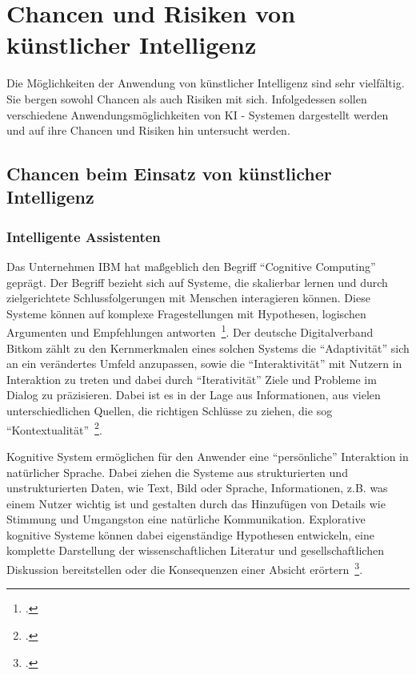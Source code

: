 \section{Chancen und Risiken von künstlicher Intelligenz} \label{Chancen und Risken von KI}
Die Möglichkeiten der Anwendung von künstlicher Intelligenz sind sehr vielfältig. Sie bergen sowohl Chancen als auch Risiken mit sich. 
Infolgedessen sollen verschiedene Anwendungsmöglichkeiten von KI - Systemen dargestellt werden und auf ihre Chancen und Risiken hin untersucht werden. 

\subsection{Chancen beim Einsatz von künstlicher Intelligenz}
\subsubsection{Intelligente Assistenten}
Das Unternehmen IBM hat maßgeblich den Begriff \enquote{Cognitive Computing} geprägt. Der Begriff bezieht sich auf Systeme,
die skalierbar lernen und durch zielgerichtete Schlussfolgerungen mit Menschen interagieren können.
Diese Systeme können auf komplexe Fragestellungen mit Hypothesen, logischen Argumenten und Empfehlungen antworten~\footcite[\vglf][]{Scherk.2017}.
Der deutsche Digitalverband Bitkom zählt zu den Kernmerkmalen eines solchen Systems die \enquote{Adaptivität} sich an ein verändertes Umfeld anzupassen, sowie die 
\enquote{Interaktivität} mit Nutzern in Interaktion zu treten und dabei durch \enquote{Iterativität} Ziele und Probleme im Dialog zu präzisieren. Dabei ist es in der Lage
aus Informationen, aus vielen unterschiedlichen Quellen, die richtigen Schlüsse zu ziehen, die sog \enquote{Kontextualität}~\footcite[\vglf][]{Scherk.2017}.

Kognitive System ermöglichen für den Anwender eine \enquote{persönliche} Interaktion in natürlicher Sprache. Dabei ziehen die Systeme aus strukturierten und unstrukturierten
Daten, wie Text, Bild oder Sprache, Informationen, z.B. was einem Nutzer wichtig ist und gestalten durch das Hinzufügen von Details wie Stimmung und Umgangston eine natürliche 
Kommunikation. 
Explorative kognitive Systeme können dabei eigenständige Hypothesen entwickeln, eine komplette Darstellung der wissenschaftlichen Literatur und gesellschaftlichen
Diskussion bereitstellen oder die Konsequenzen einer Absicht erörtern~\footcite[\vglf][]{Scherk.2017}.

